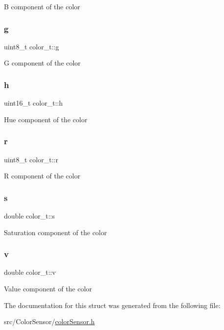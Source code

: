 B component of the color \mbox{\label{structcolor__t_a7d1a9e3552401fc5f8882f6e0c2c82aa}} 
\subsubsection{\texorpdfstring{g}{g}}
{\footnotesize\ttfamily uint8\+\_\+t color\+\_\+t\+::g}

G component of the color \mbox{\label{structcolor__t_aecabea8456e370c4aa010c7b2370c3c1}} 
\subsubsection{\texorpdfstring{h}{h}}
{\footnotesize\ttfamily uint16\+\_\+t color\+\_\+t\+::h}

Hue component of the color \mbox{\label{structcolor__t_a9138f903c9036862cfeab970b156b62d}} 
\subsubsection{\texorpdfstring{r}{r}}
{\footnotesize\ttfamily uint8\+\_\+t color\+\_\+t\+::r}

R component of the color \mbox{\label{structcolor__t_a8363dde4b09ee0eafb24539ca0d6299e}} 
\subsubsection{\texorpdfstring{s}{s}}
{\footnotesize\ttfamily double color\+\_\+t\+::s}

Saturation component of the color \mbox{\label{structcolor__t_ab631e48b407098f1da43018e831cc5ad}} 
\subsubsection{\texorpdfstring{v}{v}}
{\footnotesize\ttfamily double color\+\_\+t\+::v}

Value component of the color 

The documentation for this struct was generated from the following file\+:\begin{DoxyCompactItemize}
\item 
src/\+Color\+Sensor/\hyperlink{colorSensor_8h}{color\+Sensor.\+h}\end{DoxyCompactItemize}
